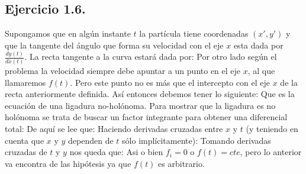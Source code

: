 


\subsection*{Ejercicio 1.6.}
Supongamos que en alg\'un instante $t$ la part\'icula tiene coordenadas $(x',y')$ y que la tangente del \'angulo que forma su velocidad con el eje $x$ esta dada por $\frac{dy(t)}{dx(t)}$. La recta tangente a la curva estar\'a dada por:
Por otro lado seg\'un el problema la velocidad siempre debe apuntar a un punto en el eje $x$, al que llamaremos $f(t)$. Pero este punto no es m\'as que el intercepto con el eje $x$ de la recta anteriormente definida. As\'i entonces debemos tener lo siguiente:
Que es la ecuaci\'on de una ligadura no-hol\'onoma. Para mostrar que la ligadura es no hol\'onoma se trata de buscar un factor integrante para obtener una diferencial total:
De aqu\'i se lee que:
Haciendo derivadas cruzadas entre $x$ y $t$ 
(y teniendo en cuenta que $x$ y $y$ dependen de $t$ s\'olo impl\'icitamente):
Tomando derivadas cruzadas de $t$ y $y$ nos queda que:
Asi o bien $f_i=0$ o $f(t)=cte$, pero lo anterior va encontra de las hip\'otesis ya que $f(t)$ es arbitrario.



